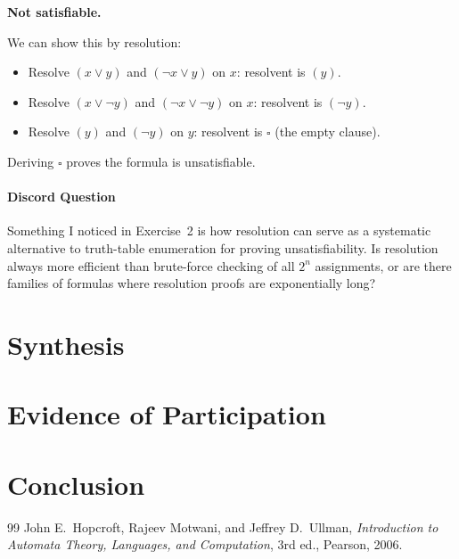 \documentclass[11pt, a4paper]{article}
\theoremstyle{definition}
\theoremstyle{remark}
\begin{document}
\textbf{Not satisfiable.}

We can show this by resolution:
\begin{itemize}
  \item Resolve $(x\lor y)$ and $(\lnot x\lor y)$ on $x$: resolvent is $(y)$.
  \item Resolve $(x\lor\lnot y)$ and $(\lnot x\lor\lnot y)$ on $x$: resolvent is $(\lnot y)$.
  \item Resolve $(y)$ and $(\lnot y)$ on $y$: resolvent is $\square$ (the empty clause).
\end{itemize}
Deriving $\square$ proves the formula is unsatisfiable.

\paragraph{Discord Question}

Something I noticed in Exercise~2 is how resolution can serve as a systematic alternative to truth-table enumeration for proving unsatisfiability.
Is resolution always more efficient than brute-force checking of all $2^n$ assignments, or are there families of formulas where resolution proofs are exponentially long?


%
%

\section{Synthesis}


\section{Evidence of Participation}


\section{Conclusion}\label{conclusion}


\begin{thebibliography}{99}
 John E.\ Hopcroft, Rajeev Motwani, and Jeffrey D.\ Ullman,
  \textit{Introduction to Automata Theory, Languages, and Computation},
  3rd ed., Pearson, 2006.
\end{thebibliography}
\end{document}
